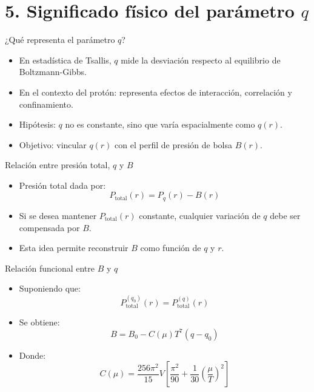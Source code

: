 \documentclass{beamer}
\begin{document}
\section[Significado físico de \( q \)]{5. Significado físico del parámetro \( q \)}
\begin{frame}{¿Qué representa el parámetro \( q \)?}
  \begin{itemize}
    \item En estadística de Tsallis, \( q \) mide la desviación respecto al equilibrio de Boltzmann-Gibbs.
    \item En el contexto del protón: representa efectos de interacción, correlación y confinamiento.
    \item Hipótesis: \( q \) no es constante, sino que varía espacialmente como \( q(r) \).
    \item Objetivo: vincular \( q(r) \) con el perfil de presión de bolsa \( B(r) \).
  \end{itemize}
\end{frame}

\begin{frame}{Relación entre presión total, \( q \) y \( B \)}
  \begin{itemize}
    \item Presión total dada por:
    \[
      P_{\text{total}}(r) = P_q(r) - B(r)
    \]
    \item Si se desea mantener \( P_{\text{total}}(r) \) constante, cualquier variación de \( q \) debe ser compensada por \( B \).
    \item Esta idea permite reconstruir \( B \) como función de \( q \) y \( r \).
  \end{itemize}
\end{frame}

\begin{frame}{Relación funcional entre \( B \) y \( q \)}
  \begin{itemize}
    \item Suponiendo que:
    \[
      P_{\text{total}}^{(q_0)}(r) = P_{\text{total}}^{(q)}(r)
    \]
    \item Se obtiene:
    \[
      B = B_0 - C(\mu) T^7 (q - q_0)
    \]
    \item Donde:
    \[
      C(\mu) = \frac{256 \pi^2}{15} V \left[ \frac{\pi^2}{90} + \frac{1}{30} \left( \frac{\mu}{T} \right)^2 \right]
    \]
  \end{itemize}
\end{frame}
\end{document}
